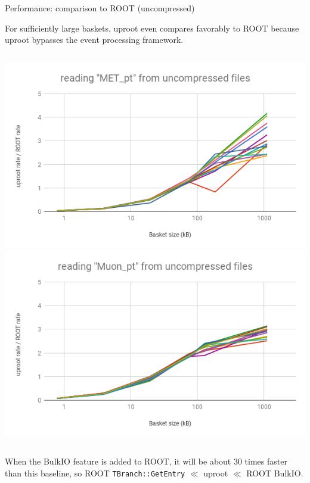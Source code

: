 \documentclass[aspectratio=169]{beamer}
\begin{document}
\begin{frame}{Performance: comparison to ROOT (uncompressed)}
\vspace{0.5 cm}

For sufficiently large baskets, uproot even compares favorably to ROOT because uproot bypasses the event processing framework.

\vspace{0.25 cm}
\begin{columns}
\includegraphics[width=0.5\linewidth]{root-none-met.png}
\includegraphics[width=0.5\linewidth]{root-none-muon.png}
\end{columns}

\vspace{0.25 cm}
When the BulkIO feature is added to ROOT, it will be about 30 times faster than this baseline, so ROOT {\tt\small TBranch::GetEntry} $\ll$ uproot $\ll$ ROOT BulkIO.
\end{frame}
\end{document}
